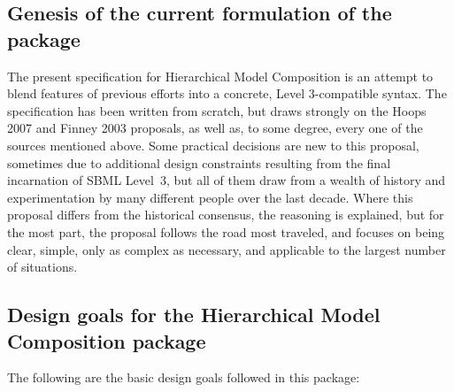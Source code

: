 \subsection{Genesis of the current formulation of the package}

The present specification for Hierarchical Model Composition is an
attempt to blend features of previous efforts into a concrete, Level
3-compatible syntax.  The specification has been written from scratch,
but draws strongly on the Hoops 2007 and Finney 2003 proposals, as well
as, to some degree, every one of the sources mentioned above.  Some
practical decisions are new to this proposal, sometimes due to
additional design constraints resulting from the final incarnation of
SBML Level~3, but all of them draw from a wealth of history and
experimentation by many different people over the last decade.  Where
this proposal differs from the historical consensus, the reasoning is
explained, but for the most part, the proposal follows the road most
traveled, and focuses on being clear, simple, only as complex as
necessary, and applicable to the largest number of situations.


\subsection{Design goals for the Hierarchical Model Composition package}
\label{sec:design-goals}

The following are the basic design goals followed in this package:

